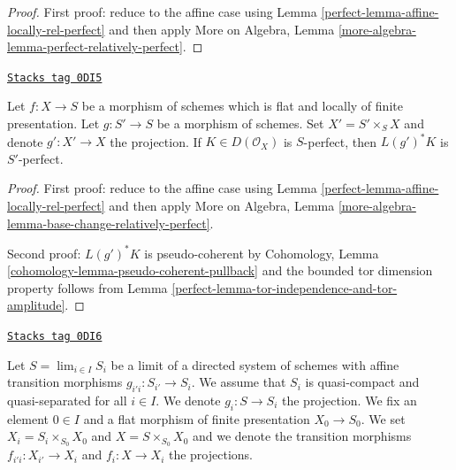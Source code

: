 \begin{proof}

First proof: reduce to the affine case using
Lemma \ref{perfect-lemma-affine-locally-rel-perfect}
and then apply More on Algebra, Lemma
\ref{more-algebra-lemma-perfect-relatively-perfect}.
\end{proof}

\begin{lemma}
\label{perfect-lemma-base-change-relatively-perfect}
\href{https://stacks.math.columbia.edu/tag/0DI5}{\texttt{Stacks tag 0DI5}}

Let $f : X \to S$ be a morphism of schemes which is flat and
locally of finite presentation.
Let $g : S' \to S$ be a morphism of schemes. Set $X' = S' \times_S X$
and denote $g' : X' \to X$ the projection.
If $K \in D(\mathcal{O}_X)$ is $S$-perfect, then $L(g')^*K$
is $S'$-perfect.
\end{lemma}

\begin{proof}

First proof: reduce to the affine case using
Lemma \ref{perfect-lemma-affine-locally-rel-perfect}
and then apply More on Algebra, Lemma
\ref{more-algebra-lemma-base-change-relatively-perfect}.

\medskip\noindent
Second proof: $L(g')^*K$ is pseudo-coherent by
Cohomology, Lemma \ref{cohomology-lemma-pseudo-coherent-pullback}
and the bounded tor dimension property follows from
Lemma \ref{perfect-lemma-tor-independence-and-tor-amplitude}.
\end{proof}

\begin{definition}
\label{perfect-situation-relative-descent}
\href{https://stacks.math.columbia.edu/tag/0DI6}{\texttt{Stacks tag 0DI6}}

Let $S = \lim_{i \in I} S_i$ be a limit of a directed system of schemes
with affine transition morphisms $g_{i'i} : S_{i'} \to S_i$.
We assume that $S_i$ is quasi-compact and quasi-separated for all $i \in I$.
We denote $g_i : S \to S_i$ the projection. We fix an element $0 \in I$
and a flat morphism of finite presentation $X_0 \to S_0$.
We set $X_i = S_i \times_{S_0} X_0$ and $X = S \times_{S_0} X_0$
and we denote the transition morphisms $f_{i'i} : X_{i'} \to X_i$
and $f_i : X \to X_i$ the projections.
\end{definition}

